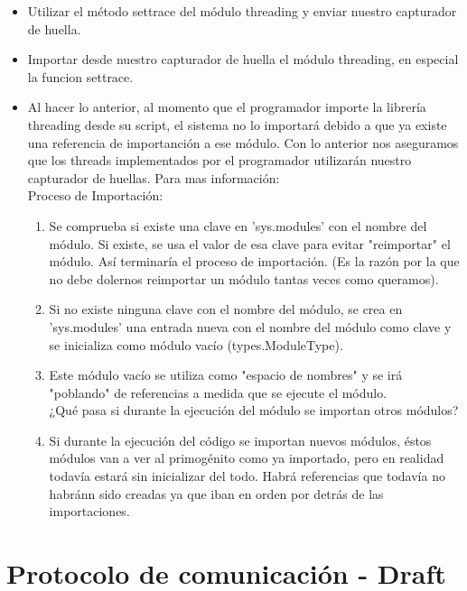 \documentclass[10pt,a4paper]{article}
\begin{document}
\begin{itemize}
\item Utilizar el método settrace del módulo threading y enviar nuestro capturador de huella.
\item Importar desde nuestro capturador de huella el módulo threading, en especial la funcion settrace.
\item Al hacer lo anterior, al momento que el programador importe la librería threading desde su script, el sistema no lo importará debido a que ya existe una referencia de importanción a ese módulo.  Con lo anterior nos aseguramos que los threads implementados por el programador utilizarán nuestro capturador de huellas.  Para mas información: \cite{lista}\\
Proceso de Importación:
\begin{enumerate}
\item Se comprueba si existe una clave en 'sys.modules' con el nombre del
módulo. Si existe, se usa el valor de esa clave para evitar
"reimportar" el módulo. Así terminaría el proceso de importación. (Es
la razón por la que no debe dolernos reimportar un módulo tantas veces
como queramos).\\
\item Si no existe ninguna clave con el nombre del módulo, se crea en
'sys.modules' una entrada nueva con el nombre del módulo como clave y
se inicializa como módulo vacío (types.ModuleType).\\
\item Este módulo vacío se utiliza como "espacio de nombres" y se irá
"poblando" de referencias a medida que se ejecute el módulo.\\

¿Qué pasa si durante la ejecución del módulo se importan otros módulos?\\

\item Si durante la ejecución del código se importan nuevos módulos,
éstos módulos van a ver al primogénito como ya importado, pero en
realidad todavía estará sin inicializar del todo. Habrá referencias
que todavía no habránn sido creadas ya que iban en orden por detrás de
las importaciones.
\end{enumerate}

\end{itemize}


\section{Protocolo de comunicación - Draft}
\end{document}

